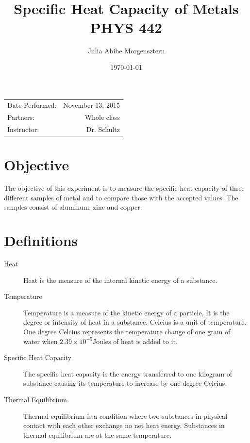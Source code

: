 \documentclass{article}
\title{Specific Heat Capacity of Metals \\ PHYS 442} %
\author{Julia Abibe Morgensztern} %
\date{\today} %
\begin{document}
\maketitle %

\begin{center}
\begin{tabular}{l r}
Date Performed: & November 13, 2015 \\ %
Partners: & Whole class \\ %
Instructor: & Dr. Schultz  %
\end{tabular}
\end{center}



\section{Objective}

The objective of this experiment is to measure the specific heat capacity of three different samples of metal and to compare those with the accepted values.  The samples consist of aluminum, zinc and copper.

\section{Definitions}
\label{definitions}
\begin{description}
\item[Heat]
Heat is the measure of the internal kinetic energy of a substance.
\item[Temperature]
Temperature is a measure of the kinetic energy of a particle.  It is the degree or intensity of heat in a substance.  Celcius is a unit of temperature.  One degree Celcius represents the temperature change of one gram of water when $2.39\times10^{-5}\text{Joules}$ of heat is added to it.

\item[Specific Heat Capacity]
The specific heat capacity is the energy transferred to one kilogram of substance causing its temperature to increase by one degree Celcius.\cite{Homer:2014}

\item[Thermal Equilibrium]
Thermal equilibrium is a condition where two substances in physical contact with each other exchange no net heat energy.  Substances in thermal equilibrium are at the same temperature.
\end{description}
\end{document}
